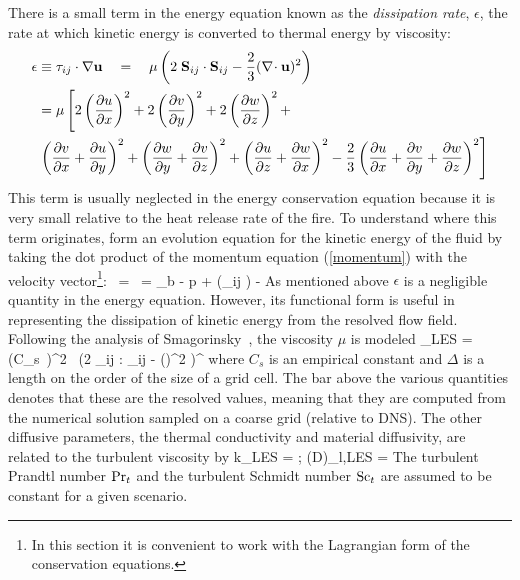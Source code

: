 There is a small term in the energy equation
known as the {\em dissipation rate}, $\epsilon$,
the rate at which kinetic energy is converted to thermal energy by viscosity:
\begin{align}
\epsilon &\equiv {\bf \tau}_{ij} \cdot \nabla {\bf u} \quad =  \quad
   \mu \left( 2 \; {\bf S}_{ij} \cdot {\bf S}_{ij}
                  - \frac{2}{3} (\nabla\!\cdot {\bf u})^2 \right)  \nonumber \\
  &= \mu \left[ 2 \left(\frac{\partial u}{\partial x}\right)^2
 + 2 \left(\frac{\partial v}{\partial y}\right)^2 + 2 \left(\frac{\partial w}{\partial z}\right)^2 + \right. \nonumber \\
&  \left.
  \left(\frac{\partial v}{\partial x}+\frac{\partial u}{\partial y}\right)^2 + \left(\frac{\partial w}{\partial y}+\frac{\partial v}{\partial z}\right)^2
 + \left(\frac{\partial u}{\partial z}+\frac{\partial w}{\partial x}\right)^2 - \frac{2}{3}
   \left(\frac{\partial u}{\partial x}+\frac{\partial v}{\partial y} + \frac{\partial w}{\partial z} \right)^2  \right]  \label{dissipation} \end{align}
This term is usually neglected in the energy conservation equation because it is very small relative to the heat release rate of
the fire. To understand where this term originates, form an evolution equation for the kinetic energy of the fluid by
taking the dot product of the momentum equation (\ref{momentum}) with the velocity vector\footnote{In this section
it is convenient to work with the Lagrangian form of the conservation equations. }:
\be \rho \,  \cdot \bu = \rho  \,  =
    \rho \bof_b \cdot \bu - \nabla p \cdot \bu + \nabla\!\cdot (\btau_{ij} \cdot \bu) - \epsilon \ee
As mentioned above $\epsilon$ is a negligible quantity in the energy equation. However, its functional form
is useful in representing the dissipation of kinetic energy from the resolved flow field.
Following the analysis of Smagorinsky~\cite{Smagorinsky:1}, the viscosity $\mu$ is modeled
\be \mu_{\hbox{\tiny LES}} = \rho \, (C_s\, \Delta)^2 \,
   \left(2 \; \overline{\bS}_{ij} : \overline{\bS}_{ij} -  (\nabla\!\cdot \overline{\bu})^2 \right)^\ha \ee
where $C_s$ is an empirical constant and $\Delta$ is a length on the
order of the size of a grid cell.
The bar above the various quantities denotes that these are the resolved values, meaning
that they are computed from the numerical solution sampled on a coarse grid (relative to DNS).
The other diffusive parameters,
the thermal conductivity and material diffusivity, are related to the turbulent viscosity by
\be k_{\hbox{\tiny LES}} = 
\quad ; \quad
 (\rho D)_{l,\hbox{\tiny LES}} = \ee
The turbulent Prandtl number $\hbox{Pr}_t$ and the turbulent Schmidt number $\hbox{Sc}_t$ are assumed to be
constant for a given scenario.

